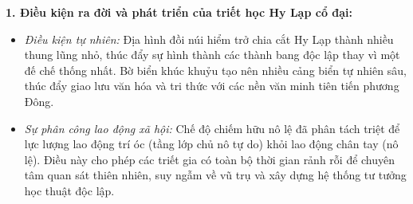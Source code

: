 \documentclass[12pt,a4paper]{article}
\begin{document}
\noindent
\textbf{1. Điều kiện ra đời và phát triển của triết học Hy Lạp cổ đại:}
\begin{itemize}
    \item \textit{Điều kiện tự nhiên:} Địa hình đồi núi hiểm trở chia cắt Hy Lạp thành nhiều thung lũng nhỏ, thúc đẩy sự hình thành các thành bang độc lập thay vì một đế chế thống nhất. Bờ biển khúc khuỷu tạo nên nhiều cảng biển tự nhiên sâu, thúc đẩy giao lưu văn hóa và tri thức với các nền văn minh tiên tiến phương Đông.
    \item \textit{Sự phân công lao động xã hội:} Chế độ chiếm hữu nô lệ đã phân tách triệt để lực lượng lao động trí óc (tầng lớp chủ nô tự do) khỏi lao động chân tay (nô lệ). Điều này cho phép các triết gia có toàn bộ thời gian rảnh rỗi để chuyên tâm quan sát thiên nhiên, suy ngẫm về vũ trụ và xây dựng hệ thống tư tưởng học thuật độc lập.
\end{itemize}
\end{document}
